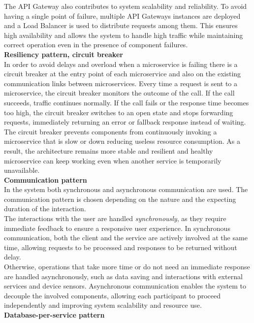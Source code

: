 The API Gateway also contributes to system scalability and reliability. To avoid having a single point of failure, multiple API Gateways instances are deployed and a Load Balancer is used to distribute requests among them. This ensures high availability and allows the system to handle high traffic while maintaining correct operation even in the presence of component failures.
\\[8pt]
\textbf{Resiliency pattern, circuit breaker}\\
In order to avoid delays and overload when a microservice is failing there is a circuit breaker at the entry point of each microservice and also on the existing communication links between microservices. Every time a request is sent to a microservice, the circuit breaker monitors the outcome of the call. If the call succeeds, traffic continues normally. If the call fails or the response time becomes too high, the circuit breaker switches to an open state and stops forwarding requests, immediately returning an error or fallback response instead of waiting.
\\The circuit breaker prevents components from continuously invoking a microservice that is slow or down reducing useless resource consumption. As a result, the architecture remains more stable and resilient and healthy microservice can keep working even when another service is temporarily unavailable.
\\[8pt]
\textbf{Communication pattern}\\
In the system both synchronous and asynchronous communication are used. The communication pattern is chosen depending on the nature and the expecting duration of the interaction. \\[5pt]
The interactions with the user are handled \textit{synchronously}, as they require immediate feedback to ensure a responsive user experience. In synchronous communication, both the client and the service are actively involved at the same time, allowing requests to be processed and responses to be returned without delay. \\[5pt]
Otherwise, operations that take more time or do not need an immediate response are handled asynchronously, such as data saving and interactions with external services and device sensors. Asynchronous communication enables the system to decouple the involved components, allowing each participant to proceed independently and improving system scalability and resource use. \\[8pt]
\textbf{Database-per-service pattern}\\
